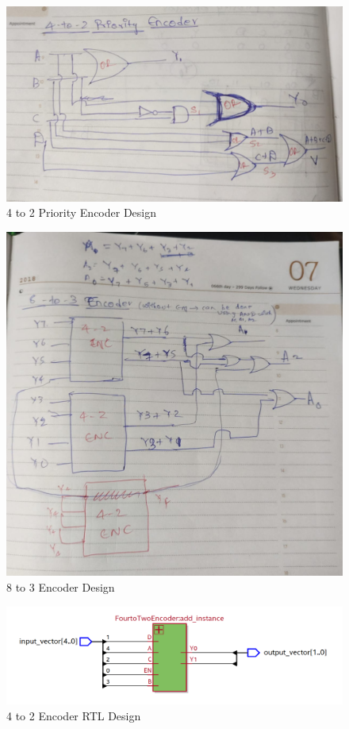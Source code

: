 \documentclass[12pt]{article}
\begin{document}
\begin{figure}[H]
\centering
  \includegraphics[scale=0.3]{Images/PriorityEnc_DESIGN.png}
  \caption{4 to 2 Priority Encoder Design}
\end{figure}

\begin{figure}[H]
\centering
  \includegraphics[scale=0.3]{Images/8to3ENCODER_DESIGN.jpeg}
  \caption{8 to 3 Encoder Design}
\end{figure}

\begin{figure}[H]
\centering
  \includegraphics[scale=0.3]{Images/4to2ENCODER_RTLVIEWER.png}
  \caption{4 to 2 Encoder RTL Design}
\end{figure}
\end{document}
